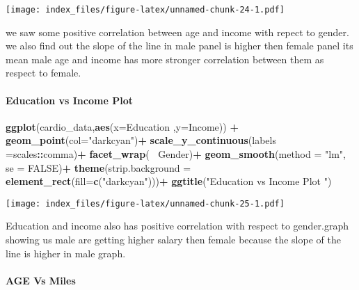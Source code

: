 \documentclass[
]{article}
\newenvironment{Shaded}{\begin{snugshade}}{\end{snugshade}}
\newcommand{\DataTypeTok}[1]{\textcolor[rgb]{0.13,0.29,0.53}{#1}}
\newcommand{\KeywordTok}[1]{\textcolor[rgb]{0.13,0.29,0.53}{\textbf{#1}}}
\newcommand{\NormalTok}[1]{#1}
\newcommand{\OperatorTok}[1]{\textcolor[rgb]{0.81,0.36,0.00}{\textbf{#1}}}
\newcommand{\OtherTok}[1]{\textcolor[rgb]{0.56,0.35,0.01}{#1}}
\newcommand{\StringTok}[1]{\textcolor[rgb]{0.31,0.60,0.02}{#1}}
\begin{document}
\texttt{[image: index\_files/figure-latex/unnamed-chunk-24-1.pdf]}

we saw some positive correlation between age and income with repect to
gender. we also find out the slope of the line in male panel is higher
then female panel its mean male age and income has more stronger
correlation between them as respect to female.

\hypertarget{education-vs-income-plot}{%
\paragraph{Education vs Income Plot}\label{education-vs-income-plot}}

\begin{Shaded}
\begin{Highlighting}[]
\KeywordTok{ggplot}\NormalTok{(cardio_data,}\KeywordTok{aes}\NormalTok{(}\DataTypeTok{x=}\NormalTok{Education ,}\DataTypeTok{y=}\NormalTok{Income)) }\OperatorTok{+}
\StringTok{  }\KeywordTok{geom_point}\NormalTok{(}\DataTypeTok{col=}\StringTok{"darkcyan"}\NormalTok{)}\OperatorTok{+}
\StringTok{  }\KeywordTok{scale_y_continuous}\NormalTok{(}\DataTypeTok{labels =}\NormalTok{scales}\OperatorTok{::}\NormalTok{comma)}\OperatorTok{+}
\StringTok{  }\KeywordTok{facet_wrap}\NormalTok{(}\OperatorTok{~}\StringTok{ }\NormalTok{Gender)}\OperatorTok{+}
\StringTok{  }\KeywordTok{geom_smooth}\NormalTok{(}\DataTypeTok{method =} \StringTok{"lm"}\NormalTok{, }\DataTypeTok{se =} \OtherTok{FALSE}\NormalTok{)}\OperatorTok{+}
\StringTok{  }\KeywordTok{theme}\NormalTok{(}\DataTypeTok{strip.background =} \KeywordTok{element_rect}\NormalTok{(}\DataTypeTok{fill=}\KeywordTok{c}\NormalTok{(}\StringTok{"darkcyan"}\NormalTok{)))}\OperatorTok{+}
\StringTok{  }\KeywordTok{ggtitle}\NormalTok{(}\StringTok{"Education vs Income Plot "}\NormalTok{)}
\end{Highlighting}
\end{Shaded}

\texttt{[image: index\_files/figure-latex/unnamed-chunk-25-1.pdf]}

Education and income also has positive correlation with respect to
gender.graph showing us male are getting higher salary then female
because the slope of the line is higher in male graph.

\hypertarget{age-vs-miles}{%
\paragraph{AGE Vs Miles}\label{age-vs-miles}}
\end{document}
